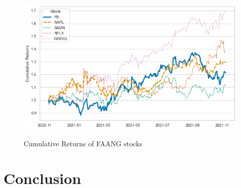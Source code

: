 \documentclass{article}
\begin{document}
\begin{figure}
    \centering
    \caption{Cumulative Returns of FAANG stocks}    
    \includegraphics[width=\linewidth]{lineplot_paper}
    \label{fig:cum_ret_faang}
  \end{figure}        

\section{Conclusion}
\blindtext[2]

 
\clearpage
\printbibliography
\end{document}

